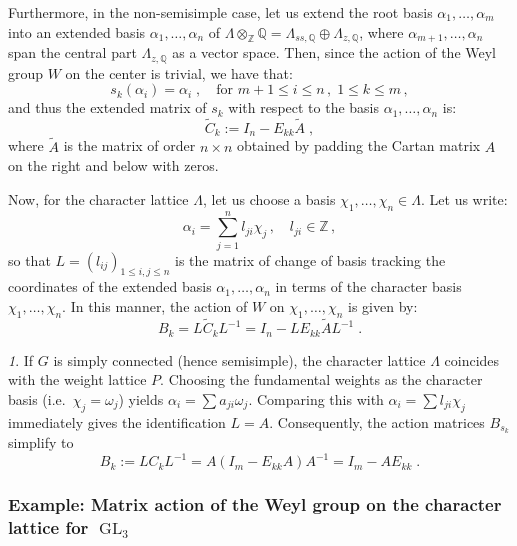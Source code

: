 \documentclass[11pt,english]{amsart}
\numberwithin{equation}{section}
\numberwithin{figure}{section}
\theoremstyle{plain}
\theoremstyle{plain}
\theoremstyle{definition}
\theoremstyle{remark}
\newtheorem{rem}[thm]{\protect\remarkname}
\newcommand{\GL}{\operatorname{GL}}
\providecommand{\remarkname}{Remark}
\begin{document}
Furthermore, in the non-semisimple case, let us extend the root basis $\alpha_1, 
\ldots, \alpha_m$ into an extended basis $\alpha_1, \ldots, \alpha_n$ of 
$\Lambda \otimes_{\mathbb{Z}} \mathbb{Q} = \Lambda_{ss,\mathbb{Q}} \oplus \Lambda_{z,\mathbb{Q}}$, 
where $\alpha_{m+1}, \ldots, \alpha_n$ span the central part $\Lambda_{z,\mathbb{Q}}$ 
as a vector space. Then, since the action of the Weyl group $W$ on the center is 
trivial, we have that:
\[
s_k(\alpha_i) = \alpha_i\; , \quad \text{for } m+1 \leq i \leq n\, , \; 1\leq k\leq m\, ,
\]
and thus the extended matrix of $s_k$ with respect to the basis $\alpha_1, \ldots, \alpha_n$ is:
\begin{equation}
\label{eq:matrix_Ck_extended}
    \widetilde{C}_{k} := I_n - E_{kk}\widetilde{A}\; ,
\end{equation}
where $\widetilde{A}$ is the matrix of order $n \times n$ obtained by padding the 
Cartan matrix $A$ on the right and below with zeros.


Now, for the character lattice $\Lambda$, let us choose a basis $\chi_1, \ldots, \chi_n \in \Lambda$. Let us write:
\[
\alpha_i = \sum_{j=1}^n l_{ji} \chi_j\, , \quad l_{ji} \in \mathbb{Z}\, ,
\]
so that $L = (l_{ij})_{1 \leq i,j \leq n}$ is the matrix of change of basis tracking the coordinates of the extended basis $\alpha_1, \ldots, \alpha_n$ in terms of the character basis $\chi_1, \ldots, \chi_n$. In this manner, the action of $W$ on $\chi_1, \ldots, \chi_n$ is given by:
\begin{equation}\label{eq:matrix-Dk}
    B_{k} = L\widetilde{C}_{k}L^{-1} = I_n - LE_{kk}\widetilde{A}L^{-1}\; .
\end{equation}

\begin{rem}
    If $G$ is simply connected (hence semisimple), the character lattice $\Lambda$ coincides with the weight lattice $P$. Choosing the fundamental weights as the character basis (i.e.\ $\chi_j = \omega_j$) yields $\alpha_i = \sum a_{ji} \omega_j$. Comparing this with $\alpha_i = \sum l_{ji} \chi_j$ immediately gives the identification $L = A$. Consequently, the action matrices $B_{s_k}$ simplify to 
\begin{equation}
  \label{eq:matrix-Dk-sc}  
B_{k} := L C_{k} L^{-1} = A (I_m - E_{kk} A) A^{-1} = I_m - A E_{kk}\; .
\end{equation}
\end{rem}





\subsubsection{Example: Matrix action of the Weyl group on the character lattice for $\GL_3$}
\end{document}
